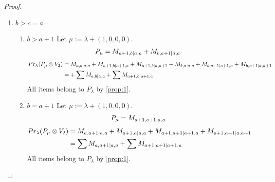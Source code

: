 \begin{proof}
\begin{enumerate}
\begin{enumerate}
\item $c=a+1$
        Let $\mu:=\lambda + (0,0,0,1) $. 
\begin{equation}\notag
  \begin{aligned}
      P_{\mu} =
      M_{a,b|a+1,a+1}
+M_{b,a|a+1,a+1}
  \end{aligned}
\end{equation}
\begin{equation}\notag
  \begin{aligned}
  Pr_{\lambda}(P_\mu \otimes V_1) &=
M_{a+1,b|a+1,a+1}
+M_{a,b|a,a+1}
+M_{a,b|a+1,a}
+M_{b,a+1|a+1,a+1}
+M_{b,a|a,a+1}
+M_{b,a|a+1,a} \\
                                  &=
\sum M_{a,b|a+1,a}
+\sum M_{a+1,b|a+1,a+1}
  \end{aligned}
\end{equation}
All items belong to $P_\lambda$ by \cref{prop:1}.
  \end{enumerate}
  
\item $b>c=a$
  \begin{enumerate}
    \item $b>a+1$
        Let $\mu:=\lambda + (1,0,0,0) $. 
\begin{equation}\notag
  \begin{aligned}
      P_{\mu} =M_{a+1,b|a,a}
+M_{b,a+1|a,a}
  \end{aligned}
\end{equation}
\begin{equation}\notag
  \begin{aligned}
  Pr_{\lambda}(P_\mu \otimes V_2) &=
M_{a,b|a,a}
+M_{a+1,b|a+1,a}
+M_{a+1,b|a,a+1}
+M_{b,a|a,a}
+M_{b,a+1|a+1,a}
+M_{b,a+1|a,a+1} \\
                                  &=
+\sum M_{a,b|a,a}
+\sum M_{a+1,b|a+1,a}
  \end{aligned}
\end{equation}
All items belong to $P_\lambda$ by \cref{prop:1}.
    
\item $b=a+1$
        Let $\mu:=\lambda + (1,0,0,0) $. 
\begin{equation}\notag
  \begin{aligned}
      P_{\mu} =M_{a+1,a+1|a,a}
  \end{aligned}
\end{equation}
\begin{equation}\notag
  \begin{aligned}
  Pr_{\lambda}(P_\mu \otimes V_2) &=
M_{a,a+1|a,a}
+M_{a+1,a|a,a}
+M_{a+1,a+1|a+1,a}
+M_{a+1,a+1|a,a+1} \\
                                  &=
\sum M_{a,a+1|a,a}
+\sum M_{a+1,a+1|a+1,a}
  \end{aligned}
\end{equation}
All items belong to $P_\lambda$ by \cref{prop:1}.
  \end{enumerate}
  

\end{enumerate}
\end{proof}
